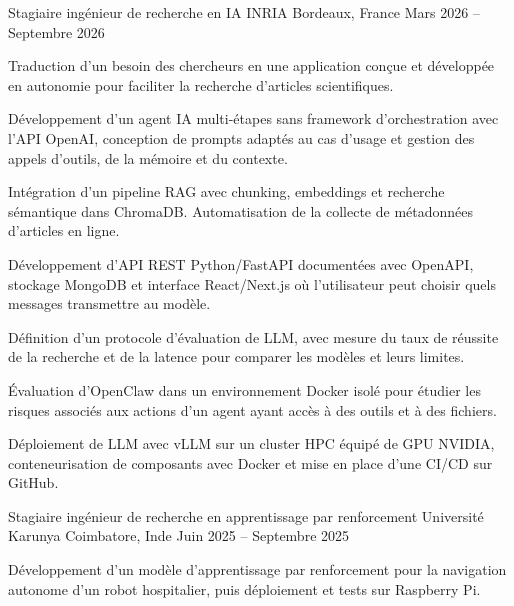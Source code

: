 
\begin{cventries}
  \cventry
    {Stagiaire ingénieur de recherche en IA}
    {INRIA}
    {Bordeaux, France}
    {Mars 2026 -- Septembre 2026}
    {
      \begin{cvitems}
        \item {Traduction d’un besoin des chercheurs en une application conçue et développée en autonomie pour faciliter la recherche d’articles scientifiques.}
        \item {Développement d’un agent IA multi-étapes sans framework d’orchestration avec l’API OpenAI, conception de prompts adaptés au cas d’usage et gestion des appels d’outils, de la mémoire et du contexte.}
        \item {Intégration d’un pipeline RAG avec chunking, embeddings et recherche sémantique dans ChromaDB. Automatisation de la collecte de métadonnées d’articles en ligne.}
        \item {Développement d’API REST Python/FastAPI documentées avec OpenAPI, stockage MongoDB et interface React/Next.js où l’utilisateur peut choisir quels messages transmettre au modèle.}
        \item {Définition d’un protocole d’évaluation de LLM, avec mesure du taux de réussite de la recherche et de la latence pour comparer les modèles et leurs limites.}
        \item {Évaluation d’OpenClaw dans un environnement Docker isolé pour étudier les risques associés aux actions d’un agent ayant accès à des outils et à des fichiers.}
        \item {Déploiement de LLM avec vLLM sur un cluster HPC équipé de GPU NVIDIA, conteneurisation de composants avec Docker et mise en place d’une CI/CD sur GitHub.}
      \end{cvitems}
    }

  \cventry
    {Stagiaire ingénieur de recherche en apprentissage par renforcement}
    {Université Karunya}
    {Coimbatore, Inde}
    {Juin 2025 -- Septembre 2025}
    {
      \begin{cvitems}
        \item {Développement d’un modèle d’apprentissage par renforcement pour la navigation autonome d’un robot hospitalier, puis déploiement et tests sur Raspberry Pi.}
      \end{cvitems}
    }
\end{cventries}
